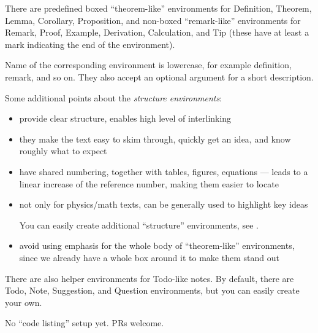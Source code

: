 \begin{remark}
    There are predefined boxed \enquote{theorem-like} environments for \textsf{Definition}, \textsf{Theorem}, \textsf{Lemma}, \textsf{Corollary}, \textsf{Proposition},
    and non-boxed \enquote{remark-like} environments for \textsf{Remark}, \textsf{Proof}, \textsf{Example}, \textsf{Derivation}, \textsf{Calculation}, and \textsf{Tip} (these have at least a mark indicating the end of the environment).

    Name of the corresponding environment is lowercase, for example \textsf{definition}, \textsf{remark}, and so on.
    They also accept an optional argument for a short description.
\end{remark}

Some additional points about the \emph{structure environments}:
\begin{itemize}
    \item provide clear structure, enables high level of interlinking
    \item they make the text easy to skim through, quickly get an idea, and know roughly what to expect
    \item have shared numbering, together with tables, figures, equations --- leads to a linear increase of the reference number, making them easier to locate
    \item not only for physics/math texts, can be generally used to highlight key ideas
          \begin{tip}
              You can easily create additional \enquote{structure} environments, see .
          \end{tip}
    \item avoid using emphasis for the whole body of \enquote{theorem-like} environments, since we already have a whole box around it to make them stand out
\end{itemize}
\vspace{1ex}

\begin{remark}
    There are also helper environments for \textsf{Todo}-like notes.
    By default, there are \textsf{Todo}, \textsf{Note}, \textsf{Suggestion}, and \textsf{Question} environments, but you can easily create your own.
\end{remark}

\begin{Note}
    No \enquote{code listing} setup yet.
    PRs welcome.
\end{Note}

